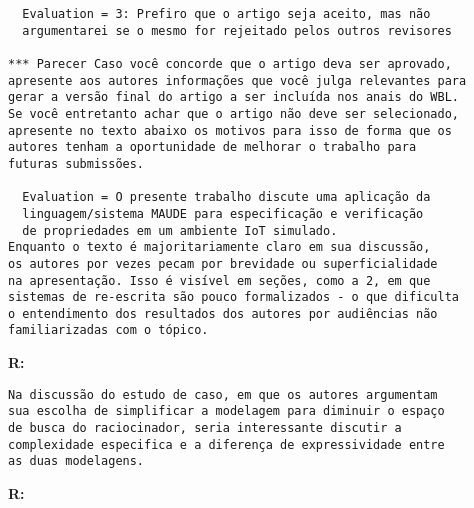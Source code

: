 \begin{verbatim}
  Evaluation = 3: Prefiro que o artigo seja aceito, mas não 
  argumentarei se o mesmo for rejeitado pelos outros revisores

*** Parecer Caso você concorde que o artigo deva ser aprovado, 
apresente aos autores informações que você julga relevantes para 
gerar a versão final do artigo a ser incluída nos anais do WBL. 
Se você entretanto achar que o artigo não deve ser selecionado, 
apresente no texto abaixo os motivos para isso de forma que os 
autores tenham a oportunidade de melhorar o trabalho para 
futuras submissões.

  Evaluation = O presente trabalho discute uma aplicação da 
  linguagem/sistema MAUDE para especificação e verificação 
  de propriedades em um ambiente IoT simulado.
Enquanto o texto é majoritariamente claro em sua discussão, 
os autores por vezes pecam por brevidade ou superficialidade 
na apresentação. Isso é visível em seções, como a 2, em que 
sistemas de re-escrita são pouco formalizados - o que dificulta 
o entendimento dos resultados dos autores por audiências não 
familiarizadas com o tópico.
\end{verbatim}

{\bf R:}

\begin{verbatim}
Na discussão do estudo de caso, em que os autores argumentam 
sua escolha de simplificar a modelagem para diminuir o espaço 
de busca do raciocinador, seria interessante discutir a 
complexidade especifica e a diferença de expressividade entre 
as duas modelagens.
\end{verbatim}

{\bf R:}
